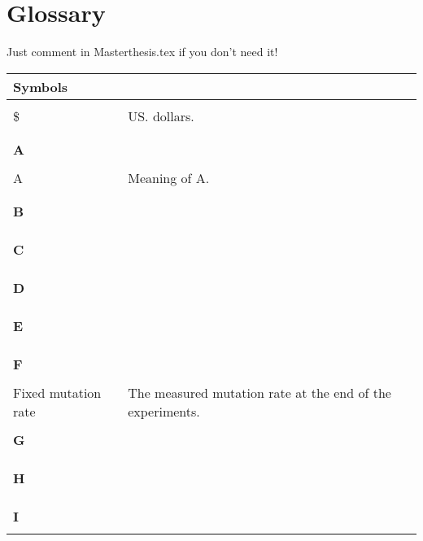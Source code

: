 \chapter{Glossary}
\label{appendixA}
Just comment \verb|| in Masterthesis.tex if you don't need it!

\begin{longtable}{p{2.5cm}p{9.5cm}}

\huge{\textbf{Symbols}}& \\
\hline
\\
\$ & US. dollars. \\
\\
\\
\huge{\textbf{A}}& \\
\hline
\\
A& Meaning of A.\\
\\
\\
\huge{\textbf{B}}& \\
\hline
\\

\\
\\
\huge{\textbf{C}}& \\
\hline
\\

\\
\\
\huge{\textbf{D}}& \\
\hline
\\

\\
\\
\huge{\textbf{E}}& \\
\hline
\\

\\
\\
\huge{\textbf{F}}& \\
\hline
\\
Fixed mutation rate& The measured mutation rate at the end of the experiments.
\\
\\
\huge{\textbf{G}}& \\
\hline
\\
\\
\\
\huge{\textbf{H}}& \\
\hline
\\

\\
\\
\huge{\textbf{I}}& \\
\hline
\\


\end{longtable}
